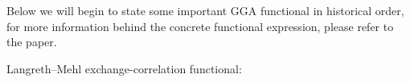 Below we will begin to state some important GGA functional in historical
order, for more information behind the concrete functional expression,
please refer to the paper.

Langreth–Mehl exchange-correlation functional\cite{PhysRevLett.47.446,
PhysRevB.28.1809}:








